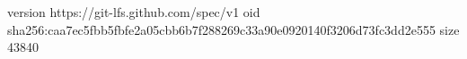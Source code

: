 version https://git-lfs.github.com/spec/v1
oid sha256:caa7ec5fbb5fbfe2a05cbb6b7f288269c33a90e0920140f3206d73fc3dd2e555
size 43840
